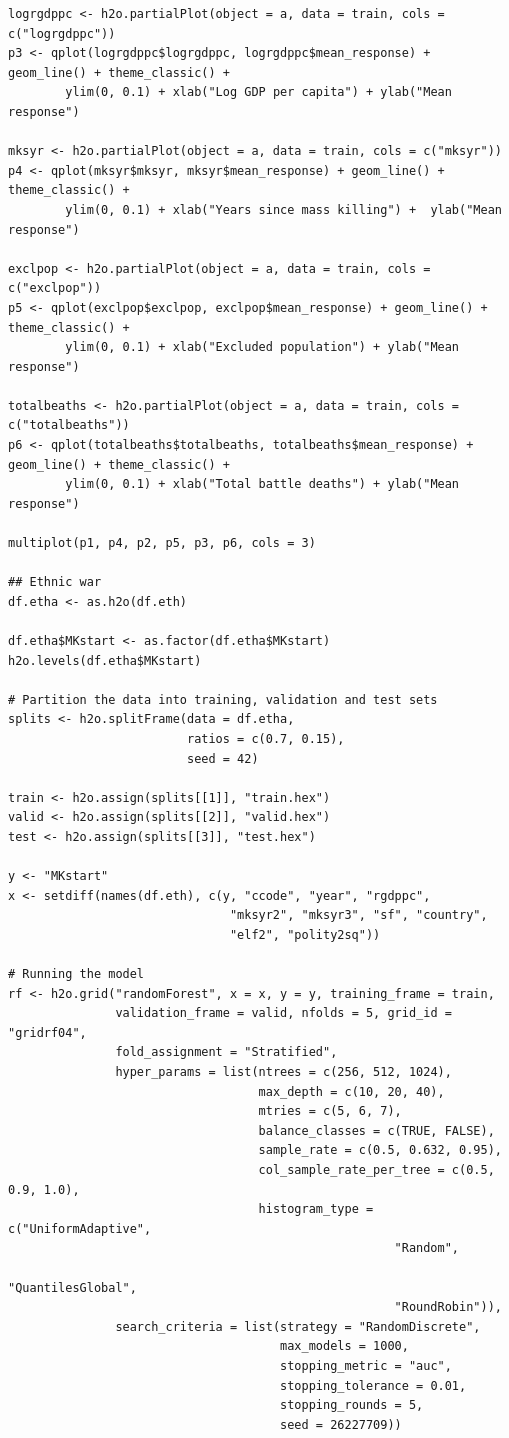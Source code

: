 \documentclass[a4paper,12pt]{article}
\begin{document}
\begin{verbatim}
logrgdppc <- h2o.partialPlot(object = a, data = train, cols = c("logrgdppc"))
p3 <- qplot(logrgdppc$logrgdppc, logrgdppc$mean_response) + geom_line() + theme_classic() +
        ylim(0, 0.1) + xlab("Log GDP per capita") + ylab("Mean response")

mksyr <- h2o.partialPlot(object = a, data = train, cols = c("mksyr"))
p4 <- qplot(mksyr$mksyr, mksyr$mean_response) + geom_line() + theme_classic() + 
        ylim(0, 0.1) + xlab("Years since mass killing") +  ylab("Mean response")

exclpop <- h2o.partialPlot(object = a, data = train, cols = c("exclpop"))
p5 <- qplot(exclpop$exclpop, exclpop$mean_response) + geom_line() + theme_classic() +
        ylim(0, 0.1) + xlab("Excluded population") + ylab("Mean response")

totalbeaths <- h2o.partialPlot(object = a, data = train, cols = c("totalbeaths"))
p6 <- qplot(totalbeaths$totalbeaths, totalbeaths$mean_response) + geom_line() + theme_classic() +
        ylim(0, 0.1) + xlab("Total battle deaths") + ylab("Mean response")

multiplot(p1, p4, p2, p5, p3, p6, cols = 3)

## Ethnic war
df.etha <- as.h2o(df.eth)

df.etha$MKstart <- as.factor(df.etha$MKstart) 
h2o.levels(df.etha$MKstart)

# Partition the data into training, validation and test sets
splits <- h2o.splitFrame(data = df.etha, 
                         ratios = c(0.7, 0.15), 
                         seed = 42) 

train <- h2o.assign(splits[[1]], "train.hex")   
valid <- h2o.assign(splits[[2]], "valid.hex") 
test <- h2o.assign(splits[[3]], "test.hex")

y <- "MKstart"
x <- setdiff(names(df.eth), c(y, "ccode", "year", "rgdppc",
                               "mksyr2", "mksyr3", "sf", "country",
                               "elf2", "polity2sq")) 

# Running the model
rf <- h2o.grid("randomForest", x = x, y = y, training_frame = train, 
               validation_frame = valid, nfolds = 5, grid_id = "gridrf04",
               fold_assignment = "Stratified",
               hyper_params = list(ntrees = c(256, 512, 1024),
                                   max_depth = c(10, 20, 40),
                                   mtries = c(5, 6, 7),
                                   balance_classes = c(TRUE, FALSE),
                                   sample_rate = c(0.5, 0.632, 0.95),
                                   col_sample_rate_per_tree = c(0.5, 0.9, 1.0),
                                   histogram_type = c("UniformAdaptive",
                                                      "Random",
                                                      "QuantilesGlobal",
                                                      "RoundRobin")),
               search_criteria = list(strategy = "RandomDiscrete", 
                                      max_models = 1000, 
                                      stopping_metric = "auc", 
                                      stopping_tolerance = 0.01, 
                                      stopping_rounds = 5, 
                                      seed = 26227709)) 


\end{verbatim}
\end{document}
